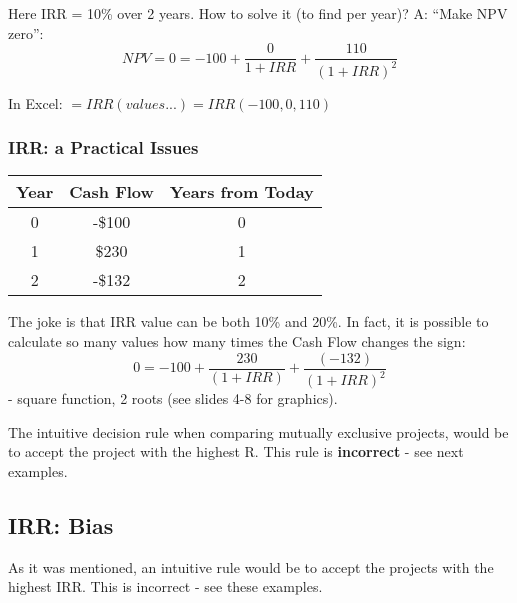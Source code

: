 \documentclass{scrartcl}
\begin{document}
Here IRR = 10\% over 2 years. How to solve it (to find per year)? A: ``Make NPV
zero'':$$NPV=0=-100+\frac0{1+IRR} + \frac{110}{(1+IRR)^2}$$

In Excel: $=IRR(values...) = IRR(-100, 0, 110)$

\subsubsection{IRR: a Practical Issues}
\label{sec:4-7}

\begin{tabular}{c|c|c}
  Year & Cash Flow & Years from Today \\
  \hline
  0 & -\$100 & 0  \\
  1 & \$230 & 1 \\
  2 & -\$132 & 2 \\
\end{tabular}

The joke is that IRR value can be both 10\% and 20\%. In fact, it is possible to
calculate so many values how many times the Cash Flow changes the sign:$$0=-100
+ \frac{230}{(1+IRR)} + \frac{(-132)}{(1+IRR)^2}$$ - square function, 2 roots
(see slides 4-8 for graphics).

The intuitive decision rule when comparing mutually exclusive projects, would be
to accept the project with the highest R. This rule is {\bf incorrect} - see
next examples.

\subsection{IRR: Bias}
\label{sec:IRR:bias}

As it was mentioned, an intuitive rule would be to accept the projects with the
highest IRR. This is incorrect - see these examples.
\end{document}
